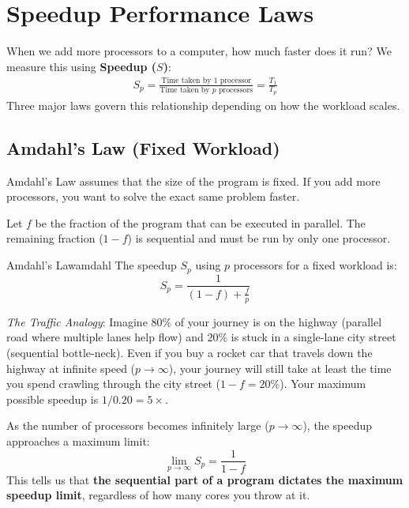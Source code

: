 \documentclass[11pt,a4paper]{article}
\begin{document}
\section{Speedup Performance Laws}

When we add more processors to a computer, how much faster does it run? We measure this using \textbf{Speedup ($S$)}:
\begin{gather*}
    S_p = \frac{\text{Time taken by 1 processor}}{\text{Time taken by } p \text{ processors}} = \frac{T_1}{T_p}
\end{gather*}
Three major laws govern this relationship depending on how the workload scales.

\subsection{Amdahl's Law (Fixed Workload)}
Amdahl's Law assumes that the size of the program is fixed. If you add more processors, you want to solve the exact same problem faster.

Let $f$ be the fraction of the program that can be executed in parallel. The remaining fraction ($1-f$) is sequential and must be run by only one processor.

\begin{theorem}{Amdahl's Law}{amdahl}
The speedup $S_p$ using $p$ processors for a fixed workload is:
\begin{equation}
    S_p = \frac{1}{(1-f) + \frac{f}{p}}
\end{equation}
\end{theorem}

\begin{notebox}
\textit{The Traffic Analogy}: 
Imagine $80\%$ of your journey is on the highway (parallel road where multiple lanes help flow) and $20\%$ is stuck in a single-lane city street (sequential bottle-neck). 
Even if you buy a rocket car that travels down the highway at infinite speed ($p \to \infty$), your journey will still take at least the time you spend crawling through the city street ($1-f = 20\%$). Your maximum possible speedup is $1 / 0.20 = 5\times$.
\end{notebox}

As the number of processors becomes infinitely large ($p \to \infty$), the speedup approaches a maximum limit:
\begin{equation}
    \lim_{p \to \infty} S_p = \frac{1}{1-f}
\end{equation}
This tells us that \textbf{the sequential part of a program dictates the maximum speedup limit}, regardless of how many cores you throw at it.
\end{document}

